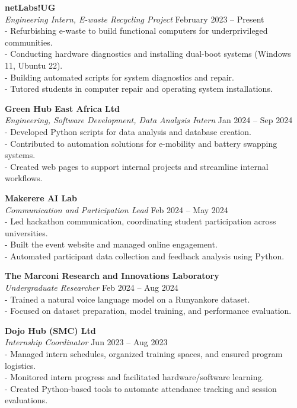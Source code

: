 \documentclass[a4paper,10pt]{article}
\begin{document}
\textbf{netLabs!UG}\\
\textit{Engineering Intern, E-waste Recycling Project} \hfill February 2023 -- Present\\
- Refurbishing e-waste to build functional computers for underprivileged communities.\\
- Conducting hardware diagnostics and installing dual-boot systems (Windows 11, Ubuntu 22).\\
- Building automated scripts for system diagnostics and repair.\\
- Tutored students in computer repair and operating system installations.

\textbf{Green Hub East Africa Ltd}\\
\textit{Engineering, Software Development, Data Analysis Intern} \hfill Jan 2024 -- Sep 2024\\
- Developed Python scripts for data analysis and database creation.\\
- Contributed to automation solutions for e-mobility and battery swapping systems.\\
- Created web pages to support internal projects and streamline internal workflows.

\textbf{Makerere AI Lab}\\
\textit{Communication and Participation Lead} \hfill Feb 2024 -- May 2024\\
- Led hackathon communication, coordinating student participation across universities.\\
- Built the event website and managed online engagement.\\
- Automated participant data collection and feedback analysis using Python.

\textbf{The Marconi Research and Innovations Laboratory}\\
\textit{Undergraduate Researcher} \hfill Feb 2024 -- Aug 2024\\
- Trained a natural voice language model on a Runyankore dataset.\\
- Focused on dataset preparation, model training, and performance evaluation.

\textbf{Dojo Hub (SMC) Ltd}\\
\textit{Internship Coordinator} \hfill Jun 2023 -- Aug 2023\\
- Managed intern schedules, organized training spaces, and ensured program logistics.\\
- Monitored intern progress and facilitated hardware/software learning.\\
- Created Python-based tools to automate attendance tracking and session evaluations.
\end{document}
